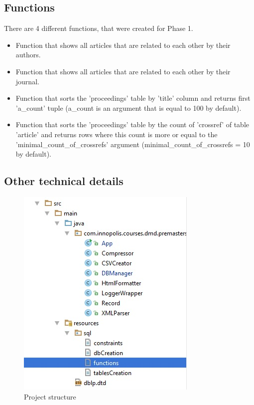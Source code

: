 \documentclass{acm_proc_article-sp}
\begin{document}
\subsection{Functions}
There are 4 different functions, that were created for Phase 1.
\begin{itemize}
	\item Function that shows all articles that are related to each other by their authors.
	\item Function that shows all articles that are related to each other by their journal.
	\item Function that sorts the 'proceedings' table by 'title' column and returns first 'a\_count' tuple (a\_count is an argument that is equal to 100 by default).
	\item Function that sorts the 'proceedings' table by the count of 'crossref' of table 'article' and returns rows where this count is more or equal to the 'minimal\_count\_of\_crossrefs' argument (minimal\_count\_of\_crossrefs = 10 by default).
\end{itemize}
\subsection{Other technical details}

\begin{figure}[h]
\centering
\includegraphics[width=0.7\linewidth]{ProjectStructure}
\caption{Project structure}
\label{fig:ProjectStructure}
\end{figure}
\end{document}
